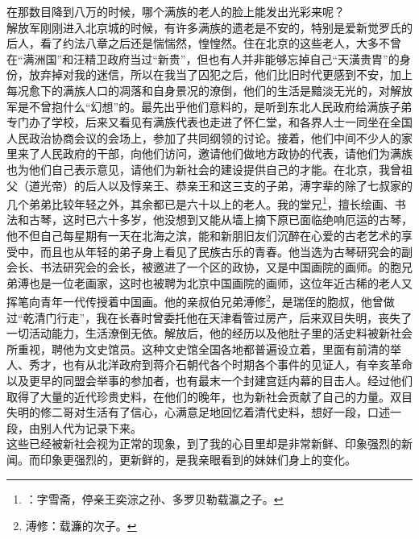 在那数目降到八万的时候，哪个满族的老人的脸上能发出光彩来呢？\\

解放军刚刚进入北京城的时候，有许多满族的遗老是不安的，特别是爱新觉罗氏的后人，看了约法八章之后还是惴惴然，惶惶然。住在北京的这些老人，大多不曾在“满洲国”和汪精卫政府当过“新贵”，但也有人并非能够忘掉自己“天潢贵胄”的身份，放弃掉对我的迷信，所以在我当了囚犯之后，他们比旧时代更感到不安，加上每况愈下的满族人口的凋落和自身景况的潦倒，他们的生活是黯淡无光的，对解放军是不曾抱什么“幻想”的。最先出乎他们意料的，是听到东北人民政府给满族子弟专门办了学校，后来又看见有满族代表也走进了怀仁堂，和各界人士一同坐在全国人民政治协商会议的会场上，参加了共同纲领的讨论。接着，他们中间不少人的家里来了人民政府的干部，向他们访问，邀请他们做地方政协的代表，请他们为满族也为他们自己表示意见，请他们为新社会的建设提供自己的才能。在北京，我曾祖父（道光帝）的后人以及惇亲王、恭亲王和这三支的子弟，溥字辈的除了七叔家的几个弟弟比较年轻之外，其余都已是六十以上的老人。我的堂兄\footnote{：字雪斋，停亲王奕淙之孙、多罗贝勒载瀛之子。}，擅长绘画、书法和古琴，这时已六十多岁，他没想到又能从墙上摘下原已面临绝响厄运的古琴，他不但自己每星期有一天在北海之滨，能和新朋旧友们沉醉在心爱的古老艺术的享受中，而且也从年轻的弟子身上看见了民族古乐的青春。他当选为古琴研究会的副会长、书法研究会的会长，被邀进了一个区的政协，又是中国画院的画师。的胞兄弟溥也是一位老画家，这时也被聘为北京中国画院的画师，这位年近古稀的老人又挥笔向青年一代传授着中国画。他的亲叔伯兄弟溥修\footnote{溥修：载濂的次子。}，是瑞侄的胞叔，他曾做过“乾清门行走”，我在长春时曾委托他在天津看管过房产，后来双目失明，丧失了一切活动能力，生活潦倒无依。解放后，他的经历以及他肚子里的活史料被新社会所重视，聘他为文史馆员。这种文史馆全国各地都普遍设立着，里面有前清的举人、秀才，也有从北洋政府到蒋介石朝代各个时期各个事件的见证人，有辛亥革命以及更早的同盟会举事的参加者，也有最末一个封建宫廷内幕的目击人。经过他们取得了大量的近代珍贵史料，在他们的晚年，也为新社会贡献了自己的力量。双目失明的修二哥对生活有了信心，心满意足地回忆着清代史料，想好一段，口述一段，由别人代为记录下来。\\

这些已经被新社会视为正常的现象，到了我的心目里却是非常新鲜、印象强烈的新闻。而印象更强烈的，更新鲜的，是我亲眼看到的妹妹们身上的变化。\\

